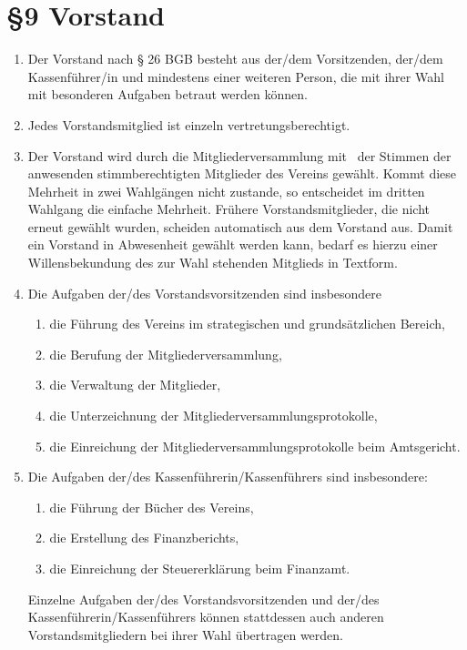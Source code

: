 \documentclass[11pt,ngerman]{article}
\begin{document}
\section*{§9 Vorstand}
\begin{enumerate}
 \item Der Vorstand nach § 26 BGB besteht aus der/dem Vorsitzenden, der/dem Kassenführer/in und mindestens einer weiteren Person, die mit ihrer Wahl mit besonderen Aufgaben betraut werden können.
 \item Jedes Vorstandsmitglied ist einzeln vertretungsberechtigt.
 \item Der Vorstand wird durch die Mitgliederversammlung mit \ der Stimmen der anwesenden stimmberechtigten Mitglieder des Vereins gewählt.
       Kommt diese Mehrheit in zwei Wahlgängen nicht zustande, so entscheidet im dritten Wahlgang die einfache Mehrheit.
       Frühere Vorstandsmitglieder, die nicht erneut gewählt wurden, scheiden automatisch aus dem Vorstand aus. Damit ein Vorstand in Abwesenheit gewählt werden kann, bedarf es hierzu einer Willensbekundung des zur Wahl stehenden Mitglieds in Textform. 
 \item Die Aufgaben der/des Vorstandsvorsitzenden sind insbesondere
  \begin{enumerate}
   \item die Führung des Vereins im strategischen und grundsätzlichen Bereich,
   \item die Berufung der Mitgliederversammlung,
   \item die Verwaltung der Mitglieder,
   \item die Unterzeichnung der Mitgliederversammlungsprotokolle,
   \item die Einreichung der Mitgliederversammlungsprotokolle beim Amtsgericht.
  \end{enumerate}


 \item Die Aufgaben der/des Kassenführerin/Kassenführers sind insbesondere:
  \begin{enumerate}
   \item die Führung der Bücher des Vereins,
   \item die Erstellung des Finanzberichts,
   \item die Einreichung der Steuererklärung beim Finanzamt.
  \end{enumerate}
  Einzelne Aufgaben der/des Vorstandsvorsitzenden und der/des Kassenführerin/Kassenführers können stattdessen auch anderen Vorstandsmitgliedern bei ihrer Wahl übertragen werden.
  

\end{enumerate}
\end{document}
